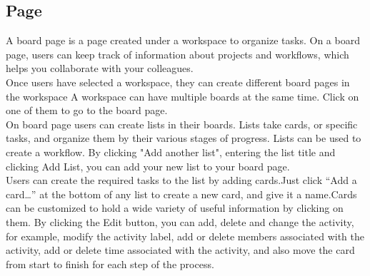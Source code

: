 \subsection{\Board Page}

A board page is a page created under a workspace to organize tasks. On a board page, users can keep track of information
about projects and workflows, which helps you collaborate with your colleagues.\\

Once users have selected a workspace, they can create different board pages in the workspace A workspace can have multiple
boards at the same time. Click on one of them to go to the board page.\\

On board page users can create lists in their boards. Lists take cards, or specific tasks, and organize them by their
various stages of progress. Lists can be used to create a workflow. By clicking "Add another list", entering the list
title and clicking Add List, you can add your new list to your board page.\\

Users can create the required tasks to the list by adding cards.Just click “Add a card…” at the bottom of any list to create
a new card, and give it a name.Cards can be customized to hold a wide variety of useful information by clicking on them. By
clicking the Edit button, you can add, delete and change the activity, for example, modify the activity label, add or delete
members associated with the activity, add or delete time associated with the activity, and also move the card from start to
finish for each step of the process.

